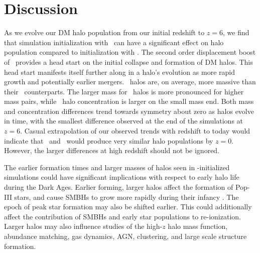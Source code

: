 
%
%

\section{Discussion}
\label{sec:discussion}







As we evolve our DM halo population from our initial redshift to $z = 6$, we find that simulation initialization with \lpt\ can have a significant effect on halo population compared to initialization with \za.  The second order displacement boost of \lpt\ provides a head start on the initial collapse and formation of DM halos.  This head start manifests itself further along in a halo's evolution as more rapid growth and potentially earlier mergers.  \lpt\ halos are, on average, more massive than their \za\ counterparts.  The larger mass for \lpt\ halos is more pronounced for higher mass pairs, while \lpt\ halo concentration is larger on the small mass end.  Both mass and concentration differences trend towards symmetry about zero as halos evolve in time, with the smallest difference observed at the end of the simulations at $z = 6$.  Casual extrapolation of our observed trends with redshift to today would indicate that \lpt\ and \za\ would produce very similar halo populations by $z = 0$.  However, the larger differences at high redshift should not be ignored.






The earlier formation times and larger masses of halos seen in \lpt-initialized simulations could have significant implications with respect to early halo life during the Dark Ages.  Earlier forming, larger halos affect the formation of Pop-III stars, and cause SMBHs to grow more rapidly during their infancy \citep{2012ApJ...761L...8H}.  The epoch of peak star formation may also be shifted earlier.  This could additionally affect the contribution of SMBHs and early star populations to re-ionization.  Larger halos may also influence studies of the high-$z$ halo mass function, abundance matching, gas dynamics, AGN, clustering, and large scale structure formation.

